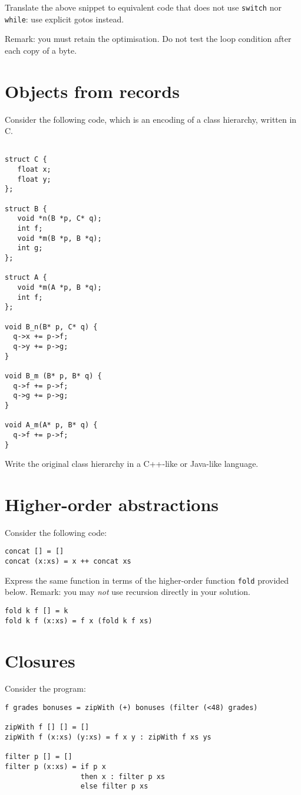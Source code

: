\documentclass{article}
\begin{document}
Translate the above snippet to equivalent code that does not use
\texttt{switch} nor \texttt{while}: use explicit gotos instead.

Remark: you must retain the optimisation. Do not test the loop
condition after each copy of a byte.

\newpage
\section{Objects from records}

Consider the following code, which is an encoding of a class
hierarchy, written in C.
\begin{verbatim}

struct C {
   float x;
   float y;
};

struct B {
   void *n(B *p, C* q);
   int f;
   void *m(B *p, B *q);
   int g;
};

struct A {
   void *m(A *p, B *q);
   int f;
};

void B_n(B* p, C* q) {
  q->x += p->f;
  q->y += p->g;
}

void B_m (B* p, B* q) {
  q->f += p->f;
  q->g += p->g;
}

void A_m(A* p, B* q) {
  q->f += p->f;
}
\end{verbatim}

Write the original class hierarchy in a C++-like or Java-like language.


\newpage
\section{Higher-order abstractions}

Consider the following code:
\begin{verbatim}
concat [] = []
concat (x:xs) = x ++ concat xs
\end{verbatim}

Express the same function in terms of the higher-order function
\texttt{fold} provided below.  Remark: you may \emph{not} use
recursion directly in your solution.

\begin{verbatim}
fold k f [] = k
fold k f (x:xs) = f x (fold k f xs)
\end{verbatim}

\section{Closures}

Consider the program:
\begin{verbatim}
f grades bonuses = zipWith (+) bonuses (filter (<48) grades)

zipWith f [] [] = []
zipWith f (x:xs) (y:xs) = f x y : zipWith f xs ys

filter p [] = []
filter p (x:xs) = if p x
                  then x : filter p xs
                  else filter p xs
\end{verbatim}
\end{document}

